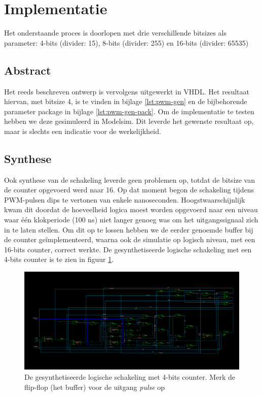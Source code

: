 \documentclass{article}
\begin{document}
\section{Implementatie}
\label{sec:pwm-impl}
\footnotesize
Het onderstaande proces is doorlopen met drie verschillende bitsizes als parameter: 4-bits (divider: 15), 8-bits (divider: 255) en 16-bits (divider: 65535)

\normalsize
\subsection{Abstract}
\label{ssec:pwm-impl-abstr}
Het reeds beschreven ontwerp is vervolgens uitgewerkt in VHDL. Het resultaat hiervan, met bitsize 4, is te vinden in bijlage \ref{lst:pwm-gen} en de bijbehorende parameter package in bijlage \ref{lst:pwm-gen-pack}. Om de implementatie te testen hebben we deze gesimuleerd in Modelsim. Dit leverde het gewenste resultaat op, maar is slechts een indicatie voor de werkelijkheid.

\subsection{Synthese}
\label{ssec:pwm-impl-synth}
Ook synthese van de schakeling leverde geen problemen op, totdat de bitsize van de counter opgevoerd werd naar 16. Op dat moment begon de schakeling tijdens PWM-pulsen dips te vertonen van enkele nanoseconden. Hoogstwaarschijnlijk kwam dit doordat de hoeveelheid logica moest worden opgevoerd naar een niveau waar één klokperiode (100 ns) niet langer genoeg was om het uitgangssignaal zich in te laten stellen. Om dit op te lossen hebben we de eerder genoemde buffer bij de counter geïmplementeerd, waarna ook de simulatie op logisch niveau, met een 16-bits counter, correct werkte.
De gesynthetiseerde logische schakeling met een 4-bits counter is te zien in figuur \ref{fig:pwm-logic}.

\begin{figure}[H]
	\centering
	\includegraphics[width=\textwidth]{resource/pwm_gen_logic.png}
	\caption{De gesynthetiseerde logische schakeling met 4-bits counter. Merk de flip-flop (het buffer) voor de uitgang \textit{pulse} op}
	\label{fig:pwm-logic}
\end{figure}
\end{document}
